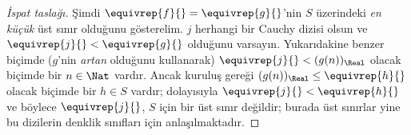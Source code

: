 \begin{proof}[İspat taslağı]
Şimdi $\equivrep{f}{} = \equivrep{g}{}$'nin $S$ üzerindeki \emph{en küçük}
üst sınır olduğunu gösterelim. $j$ herhangi bir Cauchy dizisi olsun ve
$\equivrep{j}{} < \equivrep{g}{}$ olduğunu varsayın. Yukarıdakine benzer
biçimde ($g$'nin \emph{artan} olduğunu kullanarak)
$\equivrep{j}{} < (g(n))_\Real$ olacak biçimde bir $n \in \Nat$ vardır.
Ancak kuruluş gereği $(g(n))_\Real \leq \equivrep{h}{}$ olacak biçimde bir
$h \in S$ vardır; dolayısıyla
$\equivrep{j}{} < \equivrep{h}{}$ ve böylece $\equivrep{j}{}$, $S$ için bir
üst sınır değildir; burada üst sınırlar yine bu dizilerin denklik sınıfları için
anlaşılmaktadır.
\end{proof}

